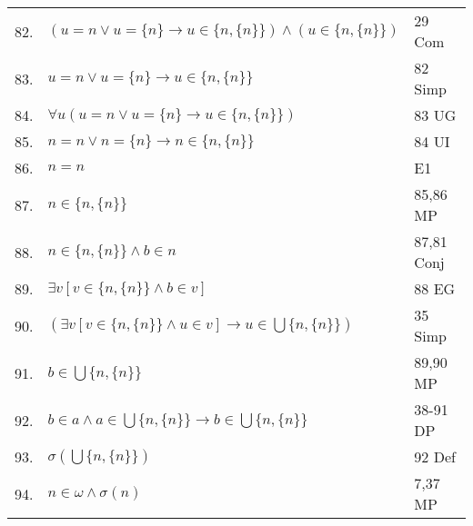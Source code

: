 \documentclass[12pt, a4paper]{article}
\begin{document}
\begin{table}[h!]
\begin{center}
\begin{tabular}{l l l}
        82.& \hspace{20mm}$(u=n\vee u=\{n\}\rightarrow u\in\{n,\{n\}\})\wedge(u\in\{n,\{n\}\})$ & 29 Com\\
        
        83.& \hspace{20mm}$u=n\vee u=\{n\}\rightarrow u\in \{n,\{n\}\}$ & 82 Simp\\
        
        84.& \hspace{20mm}$\forall u(u=n\vee u=\{n\}\rightarrow u\in\{n,\{n\}\})$ & 83 UG\\
        
        85.& \hspace{20mm}$n=n\vee n=\{n\}\rightarrow n\in\{n,\{n\}\}$ & 84 UI\\
        
        86.& \hspace{20mm}$n=n$ & E1\\
        
        87.& \hspace{20mm}$n\in\{n,\{n\}\}$ & 85,86 MP\\
        
        88.& \hspace{20mm}$n\in\{n,\{n\}\}\wedge b\in n$ & 87,81 Conj\\
        
        89.& \hspace{20mm}$\exists v[v\in\{n,\{n\}\}\wedge b\in v]$ & 88 EG\\
        
        90.& \hspace{20mm}$(\exists v[v\in\{n,\{n\}\}\wedge u\in v]\rightarrow u\in\bigcup\{n,\{n\}\})$ & 35 Simp\\
        
        91.& \hspace{20mm}$b\in\bigcup\{n,\{n\}\}$ & 89,90 MP\\
        
        92.& \hspace{10mm}$b\in a\wedge a\in\bigcup\{n,\{n\}\}\rightarrow b\in\bigcup\{n,\{n\}\}$ & 38-91 DP\\
        
        93.& \hspace{10mm}$\sigma(\bigcup\{n,\{n\}\})$ & 92 Def\\
        
        94.& \hspace{10mm}$n\in\omega\wedge\sigma(n)$ & 7,37 MP\\
        

\end{tabular}
\end{center}
\end{table}
\end{document}
